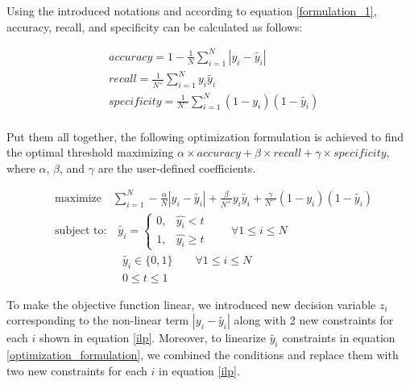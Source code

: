 \documentclass[a4paper, twocolumn]{article}
\begin{document}
Using the introduced notations and according to equation \ref{formulation_1}, accuracy, recall, and specificity can be calculated as follows:

\begin{equation}
\begin{aligned}
&accuracy = 1 - \frac{1}{N} \sum_{i=1}^{N} |y_i - \tilde{y_i}|\\
&recall = \frac{1}{N^+} \sum_{i=1}^{N} y_i \tilde{y_i}\\
&specificity = \frac{1}{N^-} \sum_{i=1}^{N} (1-y_i) (1-\tilde{y_i})\\
\end{aligned}
\end{equation}

Put them all together, the following optimization formulation is achieved to find the optimal threshold maximizing $\alpha \times \textit{accuracy} + \beta \times \textit{recall} + \gamma \times \textit{specificity}$, where $\alpha$, $\beta$, and $\gamma$ are the user-defined coefficients.

\begin{equation}
\label{optimization_formulation}
\begin{aligned}
	&\text{maximize} \quad \sum_{i=1}^{N} -\frac{\alpha}{N}|y_i -\tilde{y_i}| + \frac{\beta}{N^+} y_i \tilde{y_i} + \frac{\gamma}{N^-} (1-y_i) (1-\tilde{y_i})\\
	&\text{subject to:} \quad \tilde{y_i} = 
	\begin{cases}
	0, & \hat{y_i} < t \\
	1, & \hat{y_i} \ge t
	\end{cases} \qquad \forall 1\le i \le N\\
	& \qquad \qquad \qquad \tilde{y_i} \in \{0, 1\} \qquad \forall 1\le i \le N\\
	& \qquad \qquad \qquad 0 \le t \le 1 \qquad
\end{aligned}
\end{equation}

To make the objective function linear, we introduced new decision variable $z_i$ corresponding to the non-linear term $|y_i - \tilde{y_i}|$ along with 2 new constraints for each $i$ shown in equation \ref{ilp}. Moreover, to linearize $\tilde{y_i}$ constraints in equation \ref{optimization_formulation}, we combined the conditions and replace them with two new constraints for each $i$ in equation \ref{ilp}.
\end{document}

